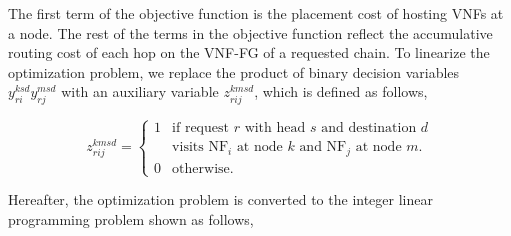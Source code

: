 \documentclass[journal]{IEEEtran}
\begin{document}
The first term of the objective function is the placement cost of hosting VNFs at a node. The rest of the terms in the objective function reflect the accumulative routing cost of each hop on the VNF-FG of a requested chain. To linearize the optimization problem, we replace the product of binary decision variables $y_{ri}^{ksd}y_{rj}^{msd}$ with an auxiliary variable $z_{rij}^{kmsd}$, which is defined as follows,

\begin{equation}
  z_{rij} ^{kmsd} = \left \{
  \begin{array}{rl}
    1 & \text{if request $r$ with head $s$ and destination $d$} \\
    &\text{visits NF$_i$ at node $k$ and NF$_j$ at node $m$}. \\
    0 & \text{otherwise}.
  \end{array} \right.
\end{equation}

Hereafter, the optimization problem is converted to the integer linear programming problem shown as follows,
\end{document}
